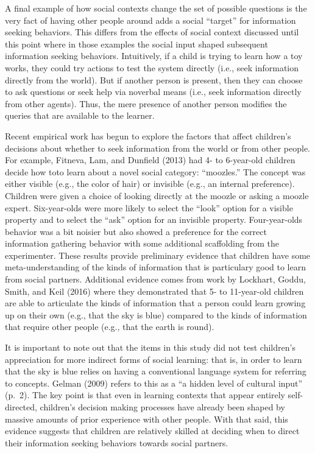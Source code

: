 \documentclass[english,floatsintext,man]{apa6}
\theoremstyle{definition}
\theoremstyle{definition}
\theoremstyle{definition}
\theoremstyle{remark}
\begin{document}
\noindent
A final example of how social contexts change the set of possible
questions is the very fact of having other people around adds a social
\enquote{target} for information seeking behaviors. This differs from
the effects of social context discussed until this point where in those
examples the social input shaped subsequent information seeking
behaviors. Intuitively, if a child is trying to learn how a toy works,
they could try actions to test the system directly (i.e., seek
information directly from the world). But if another person is present,
then they can choose to ask questions or seek help via noverbal means
(i.e., seek information directly from other agents). Thus, the mere
presence of another person modifies the queries that are available to
the learner.

Recent empirical work has begun to explore the factors that affect
children's decisions about whether to seek information from the world or
from other people. For example, Fitneva, Lam, and Dunfield (2013) had 4-
to 6-year-old children decide how toto learn about a novel social
category: \enquote{moozles.} The concept was either visible (e.g., the
color of hair) or invisible (e.g., an internal preference). Children
were given a choice of looking directly at the moozle or asking a moozle
expert. Six-year-olds were more likely to select the \enquote{look}
option for a visible property and to select the \enquote{ask} option for
an invisible property. Four-year-olds behavior was a bit noisier but
also showed a preference for the correct information gathering behavior
with some additional scaffolding from the experimenter. These results
provide preliminary evidence that children have some meta-understanding
of the kinds of information that is particulary good to learn from
social partners. Additional evidence comes from work by Lockhart, Goddu,
Smith, and Keil (2016) where they demonstrated that 5- to 11-year-old
children are able to articulate the kinds of information that a person
could learn growing up on their own (e.g., that the sky is blue)
compared to the kinds of information that require other people (e.g.,
that the earth is round).

It is important to note out that the items in this study did not test
children's appreciation for more indirect forms of social learning: that
is, in order to learn that the sky is blue relies on having a
conventional language system for referring to concepts. Gelman (2009)
refers to this as a \enquote{a hidden level of cultural input} (p.~2).
The key point is that even in learning contexts that appear entirely
self-directed, children's decision making processes have already been
shaped by massive amounts of prior experience with other people. With
that said, this evidence suggests that children are relatively skilled
at deciding when to direct their information seeking behaviors towards
social partners.
\end{document}
